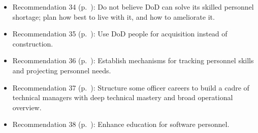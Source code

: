\documentclass[11pt,final]{article}
\begin{document}
\begin{itemize}
    \item Recommendation 34 (p.~\pageref{rec:34}): Do not believe DoD can solve its skilled personnel shortage; plan how best to live with it, and how to ameliorate it.
    \item Recommendation 35 (p.~\pageref{rec:35}): Use DoD people for acquisition instead of construction.
    \item Recommendation 36 (p.~\pageref{rec:36}): Establish mechanisms for tracking personnel skills and projecting personnel needs.
    \item Recommendation 37 (p.~\pageref{rec:37}): Structure some officer careers to build a cadre of technical managers with deep technical mastery and broad operational overview.
    \item Recommendation 38 (p.~\pageref{rec:38}): Enhance education for software personnel.
\end{itemize}
\end{document}
